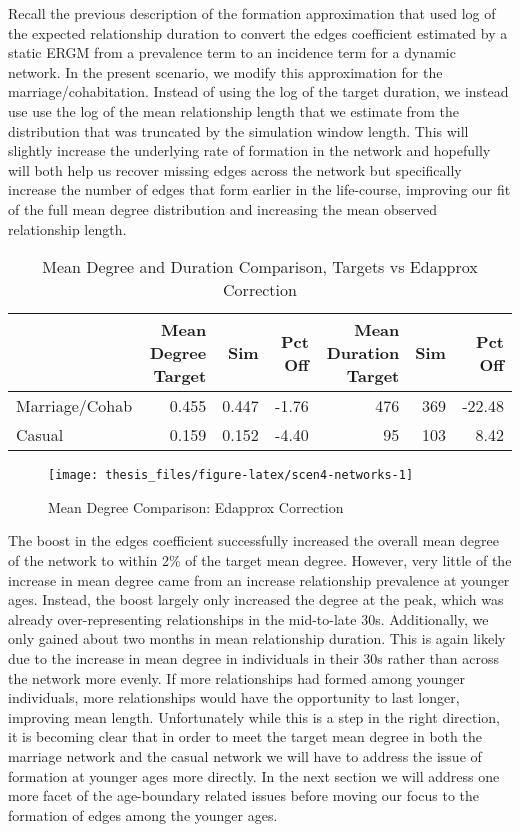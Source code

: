 \documentclass [11pt, proquest] {uwthesis}[2015/03/03]
\begin{document}
Recall the previous description of the formation approximation that used log of the expected relationship duration to convert the edges coefficient estimated by a static ERGM from a prevalence term to an incidence term for a dynamic network. In the present scenario, we modify this approximation for the marriage/cohabitation. Instead of using the log of the target duration, we instead use use the log of the mean relationship length that we estimate from the distribution that was truncated by the simulation window length. This will slightly increase the underlying rate of formation in the network and hopefully will both help us recover missing edges across the network but specifically increase the number of edges that form earlier in the life-course, improving our fit of the full mean degree distribution and increasing the mean observed relationship length.
\begin{table}

\caption{\label{tab:scen4-networks}Mean Degree and Duration Comparison, Targets vs Edapprox Correction}
\centering
\begin{tabular}[t]{lrrrrrr}
\toprule
  & Mean Degree Target & Sim & Pct Off & Mean Duration Target & Sim & Pct Off\\
\midrule
Marriage/Cohab & 0.455 & 0.447 & -1.76 & 476 & 369 & -22.48\\
Casual & 0.159 & 0.152 & -4.40 & 95 & 103 & 8.42\\
\bottomrule
\end{tabular}
\end{table}
\begin{figure}

{\centering \texttt{[image: thesis\_files/figure-latex/scen4-networks-1]} 

}

\caption{Mean Degree Comparison: Edapprox Correction}\label{fig:scen4-networks}
\end{figure}
The boost in the edges coefficient successfully increased the overall mean degree of the network to within 2\% of the target mean degree. However, very little of the increase in mean degree came from an increase relationship prevalence at younger ages. Instead, the boost largely only increased the degree at the peak, which was already over-representing relationships in the mid-to-late 30s. Additionally, we only gained about two months in mean relationship duration. This is again likely due to the increase in mean degree in individuals in their 30s rather than across the network more evenly. If more relationships had formed among younger individuals, more relationships would have the opportunity to last longer, improving mean length. Unfortunately while this is a step in the right direction, it is becoming clear that in order to meet the target mean degree in both the marriage network and the casual network we will have to address the issue of formation at younger ages more directly. In the next section we will address one more facet of the age-boundary related issues before moving our focus to the formation of edges among the younger ages.
\end{document}
